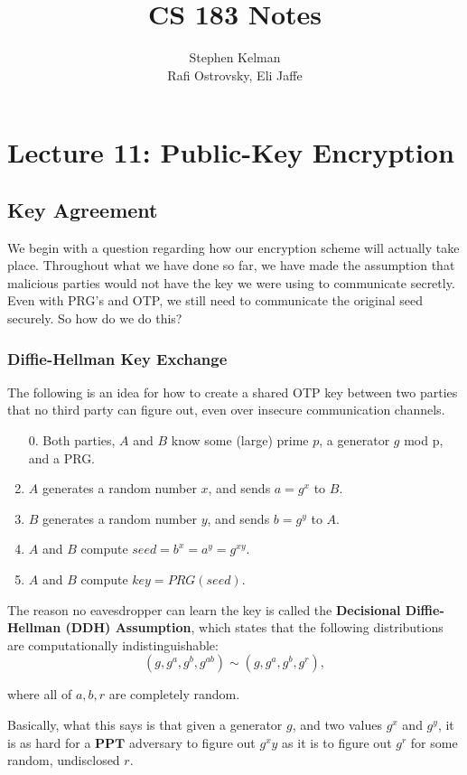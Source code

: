 \documentclass[11pt]{article}
\title{CS 183 Notes}
\author{Stephen Kelman\\ Rafi Ostrovsky, Eli Jaffe}
\newcommand{\PPT}{\mathbf{PPT}}
\begin{document}
\section{Lecture 11: Public-Key Encryption}

\subsection{Key Agreement}

We begin with a question regarding how our encryption scheme will actually take place. 
Throughout what we have done so far, we have made the assumption that malicious parties would not have the key we were using to communicate secretly.
Even with PRG's and OTP, we still need to communicate the original seed securely.
So how do we do this?

\subsubsection{Diffie-Hellman Key Exchange}
The following is an idea for how to create a shared OTP key between two parties that no third party can figure out, even over insecure communication channels.

\begin{enumerate}
\item [0.] Both parties, \(A\) and \(B\) know some (large) prime \(p\), a generator \(g\) mod p, and a PRG.
\item \(A\) generates a random number \(x\), and sends \(a=g^x\) to \(B\).
\item \(B\) generates a random number \(y\), and sends \(b=g^y\) to \(A\).
\item \(A\) and \(B\) compute \(seed=b^x=a^y = g^{xy}\).
\item \(A\) and \(B\) compute \(key = PRG(seed)\).
\end{enumerate}

The reason no eavesdropper can learn the key is called the \textbf{Decisional Diffie-Hellman (DDH) Assumption}, which states that the following distributions are computationally indistinguishable:
\[(g,g^a,g^b,g^{ab})\sim (g,g^a,g^b,g^r),\]

where all of \(a,b,r\) are completely random.\smallskip

Basically, what this says is that given a generator \(g\), and two values \(g^x\) and \(g^y\), it is as hard for a \(\PPT\) adversary to figure out \(g^xy\) as it is to figure out \(g^r\) for some random, undisclosed \(r\).
\end{document}
